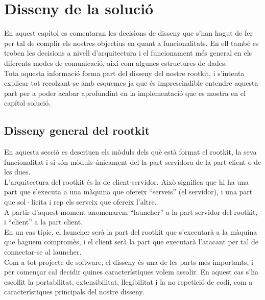 \chapter{Disseny de la solució}

En aquest capítol es comentaran les decisions de disseny que s'han hagut de fer per tal de complir els 
nostres objectius en quant a funcionalitats. En ell també es troben les decisions a nivell d'arquitectura
i el funcionament més general en els diferents modes de comunicació, així com algunes estructures de dades. \\

Tota aquesta informació forma part del disseny del nostre rootkit, i s'intenta explicar tot recolzant-se
amb esquemes ja que és imprescindible entendre aquesta part per a poder acabar aprofundint en la 
implementació que es mostra en el capítol solució. \\

\section{Disseny general del rootkit}

En aquesta secció es descriuen els mòduls dels què està format el rootkit, la seva funcionalitat
i si són mòduls únicament del la part servidora de la part client o de les dues. \\

L'arquitectura del rootkit és la de client-servidor. Això significa que hi ha una part que 
s'executa a una màquina que ofereix ``serveis'' (el servidor), i una part que sol·licita i
rep els serveix que ofereix l'altre. \\

A partir d'aquest moment anomenarem ``launcher'' a la part servidor del rootkit, i ``client''
a la part client. \\

En un cas típic, el launcher serà la part del rootkit que s'executarà a la màquina que haguem 
compromès, i el client serà la part que executarà l'atacant per tal de connectar-se al launcher. \\

Com a tot projecte de software, el disseny és una de les parts més importants, i per començar 
cal decidir quines característiques volem assolir. En aquest cas s'ha escollit la portabilitat, 
extensibilitat, llegibilitat i la no repetició de codi, com a característiques principals del 
nostre disseny. \\

